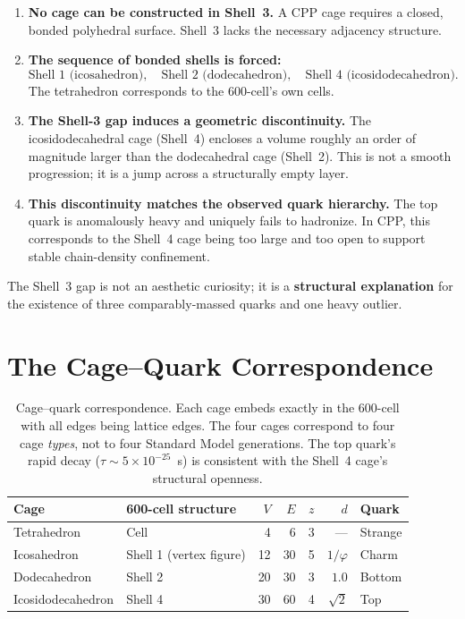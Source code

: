 \documentclass[11pt,letterpaper]{article}
\newcommand{\phig}{\varphi}
\begin{document}
\begin{enumerate}
\item \textbf{No cage can be constructed in Shell~3.}
  A CPP cage requires a closed, bonded polyhedral surface.  Shell~3
  lacks the necessary adjacency structure.

\item \textbf{The sequence of bonded shells is forced:}
  \[
  \text{Shell 1 (icosahedron)},\quad
  \text{Shell 2 (dodecahedron)},\quad
  \text{Shell 4 (icosidodecahedron)}.
  \]
  The tetrahedron corresponds to the 600-cell's own cells.

\item \textbf{The Shell-3 gap induces a geometric discontinuity.}
  The icosidodecahedral cage (Shell~4) encloses a volume roughly
  an order of magnitude larger than the dodecahedral cage (Shell~2).
  This is not a smooth progression; it is a jump across a
  structurally empty layer.

\item \textbf{This discontinuity matches the observed quark
  hierarchy.}
  The top quark is anomalously heavy and uniquely fails to
  hadronize.  In CPP, this corresponds to the Shell~4 cage being
  too large and too open to support stable chain-density
  confinement.
\end{enumerate}

The Shell~3 gap is not an aesthetic curiosity; it is a
\textbf{structural explanation} for the existence of three
comparably-massed quarks and one heavy outlier.

\section{The Cage--Quark Correspondence}
\label{sec:correspondence}

\begin{table}[H]
\centering
\caption{Cage--quark correspondence.  Each cage embeds exactly in
  the 600-cell with all edges being lattice edges.  The four cages
  correspond to four cage \emph{types}, not to four Standard Model
  generations.  The top quark's rapid decay ($\tau \sim 5 \times
  10^{-25}$~s) is consistent with the Shell~4 cage's structural
  openness.}
\label{tab:correspondence}
\begin{tabular}{@{}llrrrrl@{}}
\toprule
Cage & 600-cell structure & $V$ & $E$ & $z$ & $d$ & Quark \\
\midrule
Tetrahedron & Cell & 4 & 6 & 3 & --- & Strange \\
Icosahedron & Shell 1 (vertex figure) & 12 & 30 & 5 & $1/\phig$ & Charm \\
Dodecahedron & Shell 2 & 20 & 30 & 3 & $1.0$ & Bottom \\
Icosidodecahedron & Shell 4 & 30 & 60 & 4 & $\sqrt{2}$ & Top \\
\bottomrule
\end{tabular}
\end{table}
\end{document}
